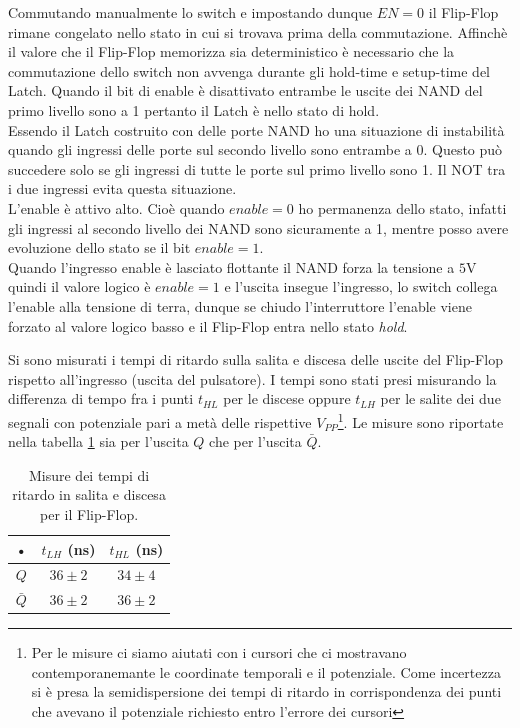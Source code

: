 \documentclass[10pt,a4paper]{article}
\begin{document}
Commutando manualmente lo switch e impostando dunque $EN = 0$ il Flip-Flop rimane congelato nello stato in cui si trovava prima della commutazione.
Affinchè il valore che il Flip-Flop memorizza sia deterministico è necessario che la commutazione dello switch non avvenga durante gli hold-time e setup-time del Latch. Quando il bit di enable è disattivato entrambe le uscite dei NAND del primo livello sono a 1 pertanto il Latch è nello stato di hold.\\

Essendo il Latch costruito con delle porte NAND ho una situazione di instabilità quando gli ingressi delle porte sul secondo livello sono entrambe a 0. Questo può succedere solo se gli ingressi di tutte le porte sul primo livello sono 1. Il NOT tra i due ingressi evita questa situazione.\\
L'enable è attivo alto. Cioè quando $enable = 0$ ho permanenza dello stato, infatti gli ingressi al secondo livello dei NAND sono sicuramente a 1, mentre posso avere evoluzione dello stato se il bit $enable = 1$.\\
Quando l'ingresso enable è lasciato flottante il NAND forza la tensione a $5$V quindi il valore logico è   $enable = 1$ e l'uscita insegue l'ingresso, lo switch collega l'enable alla tensione di terra, dunque se chiudo l'interruttore l'enable viene forzato al valore logico basso e il Flip-Flop entra nello stato \emph{hold}.%

Si sono misurati i tempi di ritardo sulla salita e discesa delle uscite del Flip-Flop rispetto all'ingresso (uscita del pulsatore). I tempi sono stati presi misurando la differenza di tempo fra i punti $t_{HL}$ per le discese oppure $t_{LH}$ per le salite dei due segnali con potenziale pari a metà delle rispettive $V_{PP}$\footnote{Per le misure ci siamo aiutati con i cursori che ci mostravano contemporanemante le coordinate temporali e il potenziale. Come incertezza si è presa la semidispersione dei tempi di ritardo in corrispondenza dei punti che avevano il potenziale richiesto entro l'errore dei cursori}. Le misure sono riportate nella tabella \ref{ritardo} sia per l'uscita $Q$ che per l'uscita $\bar{Q}$.

\begin{table}[!htb]
\centering
\begin{tabular}{|c|c|c|}
\hline 
• & $t_{LH}$ (ns) & $t_{HL}$ (ns)\\
\hline
$Q$ & $36 \pm 2$ & $34 \pm 4$\\
\hline
$\bar{Q}$ & $36 \pm 2$ & $36 \pm 2$\\
\hline
\end{tabular}
\caption{Misure dei tempi di ritardo in salita e discesa per il Flip-Flop.\label{ritardo}}
\end{table}
\end{document}
